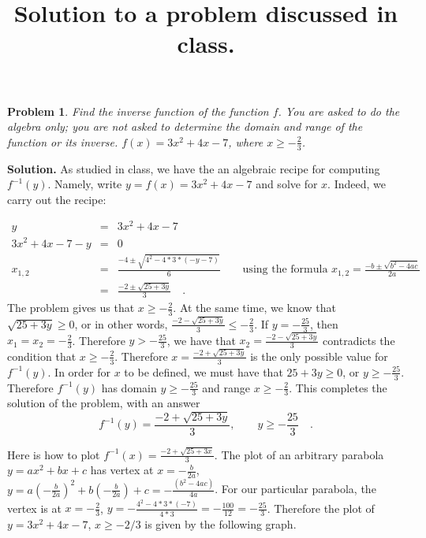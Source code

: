 \documentclass{article}
\date{}
\title{
Solution to a problem discussed in class.
}
\newtheorem{problem}{Problem}
\begin{document}
\maketitle
\begin{problem}
Find the inverse function of the function $f$. You are asked to do the algebra only; you are not asked to determine the domain and range of the function or its inverse. 
$f(x)= 3x^2+4x-7$, where $x\geq -\frac{2}{3}$.
\end{problem}
\textbf{Solution.} As studied in class, we have the an algebraic recipe for computing $f^{-1}(y)$. Namely, write $y=f(x)=3x^2+4x-7$ and solve for $x$. Indeed, we carry out the recipe:

\begin{eqnarray*}
y&=& 3x^2+4x-7\\
3x^2+4x-7-y&=&0 \\
x_{1,2} &=& \frac{-4 \pm \sqrt{4^2-4*3*(-y-7) }}{6} \quad \quad \text{using the formula } x_{1,2}=\frac{-b\pm \sqrt{b^2-4ac}}{2a} \\
~&=& \frac{-2 \pm \sqrt{25+3y}}{3}\quad .
\end{eqnarray*}
The problem gives us that $x\geq -\frac{2}{3}$. At the same time, we know that $\sqrt{25+3y} \geq 0$, or in other words, $\frac{-2-\sqrt{25+3y}}{3} \leq -\frac{2}{3}$. If $y=-\frac{25}{3}$, then $x_1=x_2=-\frac{2}3$. Therefore $y>-\frac{25}3 $, we have that $x_2=\frac{-2-\sqrt{25+3y}}{3} $ contradicts the condition  that $x\geq -\frac{2}3$. Therefore $x=\frac{-2 +\sqrt{25+3y}}{3}$ is the only possible value for $f^{-1}(y)$. In order for $x$ to be defined, we must have that $25+3y\geq 0$, or $y\geq -\frac{25}{3}$.
Therefore $f^{-1}(y) $ has domain $y\geq -\frac{25}3$ and range $x\geq -\frac{2}{3}$. This completes the solution of the problem, with an answer 
\[
f^{-1}(y)=\frac{-2+\sqrt{25+3y}}{3}, \quad \quad y\geq -\frac{25}3\quad . 
\]

Here is how to plot $f^{-1}(x)= \frac{-2+ \sqrt{25+3x}}{3}$. The plot of an arbitrary parabola $y=ax^2+bx+c$ has vertex at $x=-\frac{b}{2a}$, $y= a\left(-\frac{b}{2a}\right)^2 + b\left(-\frac{b}{2a}\right) + c= -\frac{(b^2-4ac)}{4a}$.  For our particular parabola, the vertex is at $x=-\frac{2}{3}$, $y=-\frac{4^2- 4* 3*(-7)}{4*3}= -\frac{100}{12}= -\frac{25}{3}$. Therefore the plot of $y=3x^{2}+4x-7$, $x\geq -2/3$ is given by the following graph. 
 
\end{document}
